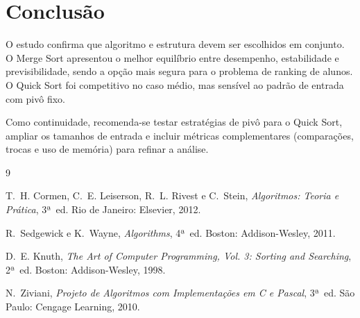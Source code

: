 \documentclass[conference]{IEEEtran}
\begin{document}
\section{Conclusão}

O estudo confirma que algoritmo e estrutura devem ser escolhidos em conjunto. O Merge Sort apresentou o melhor equilíbrio entre desempenho, estabilidade e previsibilidade, sendo a opção mais segura para o problema de ranking de alunos. O Quick Sort foi competitivo no caso médio, mas sensível ao padrão de entrada com pivô fixo.

Como continuidade, recomenda-se testar estratégias de pivô para o Quick Sort, ampliar os tamanhos de entrada e incluir métricas complementares (comparações, trocas e uso de memória) para refinar a análise.

\begin{thebibliography}{9}

T.~H. Cormen, C.~E. Leiserson, R.~L. Rivest e C.~Stein, \textit{Algoritmos: Teoria e Prática}, 3ª~ed. Rio de Janeiro: Elsevier, 2012.

R.~Sedgewick e K.~Wayne, \textit{Algorithms}, 4ª~ed. Boston: Addison-Wesley, 2011.

D.~E. Knuth, \textit{The Art of Computer Programming, Vol. 3: Sorting and Searching}, 2ª~ed. Boston: Addison-Wesley, 1998.

N.~Ziviani, \textit{Projeto de Algoritmos com Implementações em C e Pascal}, 3ª~ed. São Paulo: Cengage Learning, 2010.

\end{thebibliography}
\end{document}
